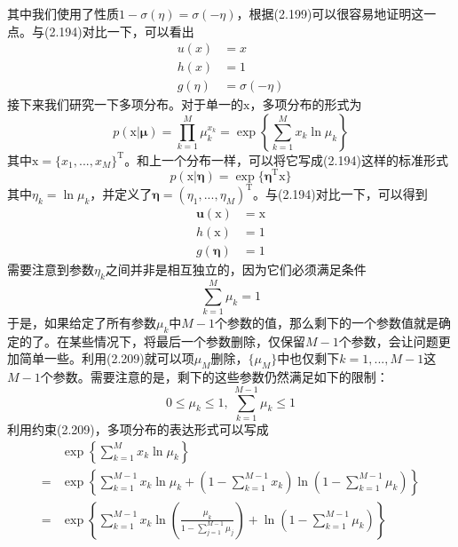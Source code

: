 \documentclass[b5paper]{book}
\numberwithin{equation}{chapter}
\newcommand {\bx} {\boldsymbol{\mathrm{x}}}
\newcommand {\rmT} {\mathrm{T}}
\newcommand {\bfMu} {\boldsymbol{\mu}}
\newcommand {\bfeta} {\boldsymbol{\eta}}
\begin{document}
{\begin{equation}
	\end{equation}
	其中我们使用了性质$1-\sigma(\eta)=\sigma(-\eta)$，根据(2.199)可以很容易地证明这一点。与(2.194)对比一下，可以看出
	\begin{align}
		u(x) &= x \\
		h(x) &= 1 \\
		g(\eta) &= \sigma(-\eta)
	\end{align}
	\indent 接下来我们研究一下多项分布。对于单一的$\bx$，多项分布的形式为
	\begin{equation}
		p(\bx|\bfMu)=\prod_{k=1}^M \mu_k^{x_k}=\exp\left\{\sum_{k=1}^M x_k \ln \mu_k\right\}
	\end{equation}
	其中$\bx=\{x_1,...,x_M\}^{\rmT}$。和上一个分布一样，可以将它写成(2.194)这样的标准形式
	\begin{equation}
		p(\bx|\bfeta) = \exp\{\bfeta^{\rmT}\bx\}
	\end{equation}
	其中$\eta_k=\ln \mu_k$，并定义了$\bfeta=(\eta_1,...,\eta_M)^{\rmT}$。与(2.194)对比一下，可以得到
	\begin{align}
		\mathbf{u}(\bx) &= \bx \\
		h(\bx) &= 1 \\
		g(\bfeta) &= 1
	\end{align}
	需要注意到参数$\eta_k$之间并非是相互独立的，因为它们必须满足条件
	\begin{equation}
		\sum_{k=1}^M  \mu_k = 1
	\end{equation}
	于是，如果给定了所有参数$\mu_k$中$M-1$个参数的值，那么剩下的一个参数值就是确定的了。在某些情况下，将最后一个参数删除，仅保留$M-1$个参数，会让问题更加简单一些。利用(2.209)就可以项$\mu_M$删除，$\{\mu_M\}$中也仅剩下$k=1,...,M-1$这$M-1$个参数。需要注意的是，剩下的这些参数仍然满足如下的限制：
	\begin{equation}
		0 \leqslant \mu_k \leqslant 1, \  \sum_{k=1}^{M-1}\mu_k \leqslant 1
	\end{equation}
	利用约束(2.209)，多项分布的表达形式可以写成
	\begin{equation}
	\begin{split}
		&\exp\left\{\sum_{k=1}^M x_k \ln \mu_k\right\} \\
		= &\exp\left\{\sum_{k=1}^{M-1}x_k \ln \mu_k + \left(1-\sum_{k=1}^{M-1}x_k\right) \ln \left(1-\sum_{k=1}^{M-1}\mu_k\right)\right\} \\
		= &\exp\left\{\sum_{k=1}^{M-1}x_k \ln \left(\frac{\mu_k}{1-\sum_{j=1}^{M-1}\mu_j}\right) + \ln \left(1-\sum_{k=1}^{M-1}\mu_k\right)\right\}
	\end{split}
	\end{equation}
}
\end{document}
